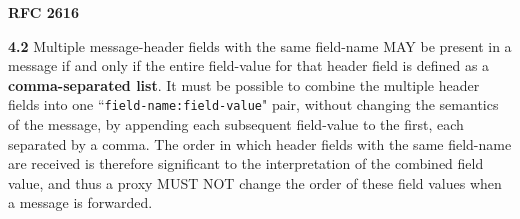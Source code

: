 \textbf{RFC 2616}
\columnseprule=1pt    %
\begin{multicols}{2}  %
	\begin{spacing}{0.8} %
		\textbf{4.2}
		{\footnotesize Multiple message-header fields with the same field-name MAY be present in a message if and only if the entire field-value for that header field is defined as a \textbf{comma-separated list}. It must be possible to combine the multiple header fields into one ``\texttt{field-name:field-value}" pair, without changing the semantics of the message, by appending each subsequent field-value to the first, each separated by a comma. The order in which header fields with the same field-name are received is therefore significant to the interpretation of the combined field value, and thus a proxy MUST NOT change the order of these field values when a message is forwarded. }
	

\end{spacing}
\end{multicols}
